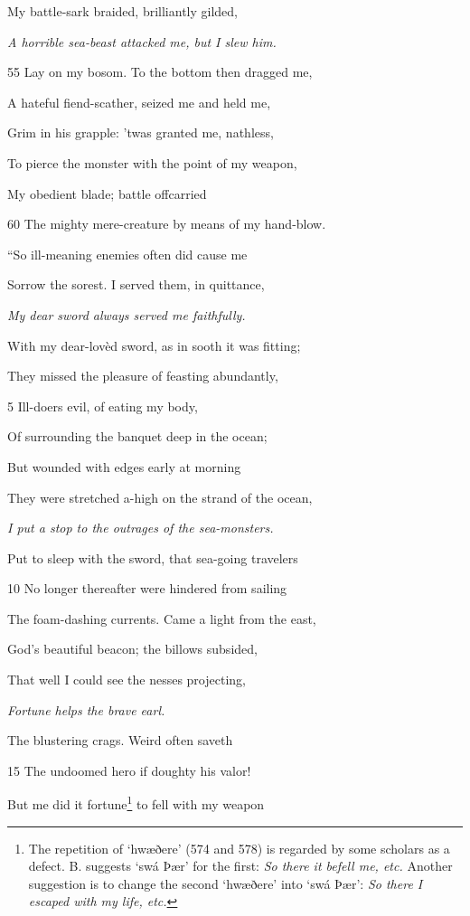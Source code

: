 My battle-sark braided, brilliantly gilded,

\emph{A horrible sea-beast
attacked me,
but I slew him.}

55
Lay on my bosom. To the bottom then dragged me,

A hateful fiend-scather, seized me and held me,

Grim in his grapple: ’twas granted me, nathless,

To pierce the monster with the point of my weapon,

My obedient blade; battle offcarried

60
The mighty mere-creature by means of my hand-blow.



“So ill-meaning enemies often did cause me

Sorrow the sorest. I served them, in quittance,

\emph{My dear sword
always served me
faithfully.}

With my dear-lovèd sword, as in sooth it was fitting;

They missed the pleasure of feasting abundantly,

5
Ill-doers evil, of eating my body,

Of surrounding the banquet deep in the ocean;

But wounded with edges early at morning

They were stretched a-high on the strand of the ocean,

\emph{I put a stop to the
outrages of the sea-monsters.}

Put to sleep with the sword, that sea-going travelers

10
No longer thereafter were hindered from sailing

The foam-dashing currents. Came a light from the east,

God’s beautiful beacon; the billows subsided,

That well I could see the nesses projecting,

\emph{Fortune helps the
brave earl.}

The blustering crags. Weird often saveth

15
The undoomed hero if doughty his valor!

But me did it fortune\footnote{The repetition of ‘hwæðere’ (574 and 578) is regarded by some scholars
as a defect. B. suggests ‘swá Þær’ for the first: \emph{So there it befell me, etc.}
Another suggestion is to change the second ‘hwæðere’ into ‘swá Þær’: \emph{So
there I escaped with my life, etc.}} to fell with my weapon


